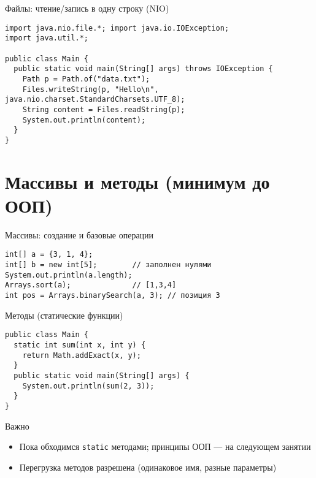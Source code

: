\documentclass[aspectratio=169]{beamer}
\begin{document}
\begin{frame}[fragile]{Файлы: чтение/запись в одну строку (NIO)}
\lstset{language=JavaLite}
\begin{lstlisting}
import java.nio.file.*; import java.io.IOException;
import java.util.*;

public class Main {
  public static void main(String[] args) throws IOException {
    Path p = Path.of("data.txt");
    Files.writeString(p, "Hello\n", java.nio.charset.StandardCharsets.UTF_8);
    String content = Files.readString(p);
    System.out.println(content);
  }
}
\end{lstlisting}
\end{frame}

\section{Массивы и методы (минимум до ООП)}

\begin{frame}[fragile]{Массивы: создание и базовые операции}
\lstset{language=JavaLite}
\begin{lstlisting}
int[] a = {3, 1, 4};
int[] b = new int[5];        // заполнен нулями
System.out.println(a.length);
Arrays.sort(a);              // [1,3,4]
int pos = Arrays.binarySearch(a, 3); // позиция 3
\end{lstlisting}
\end{frame}

\begin{frame}[fragile]{Методы (статические функции)}
\lstset{language=JavaLite}
\begin{lstlisting}
public class Main {
  static int sum(int x, int y) {
    return Math.addExact(x, y);
  }
  public static void main(String[] args) {
    System.out.println(sum(2, 3));
  }
}
\end{lstlisting}
\begin{block}{Важно}
  \begin{itemize}
    \item Пока обходимся \texttt{static} методами; принципы ООП — на следующем занятии
    \item Перегрузка методов разрешена (одинаковое имя, разные параметры)
  \end{itemize}
\end{block}
\end{frame}

\end{document}
